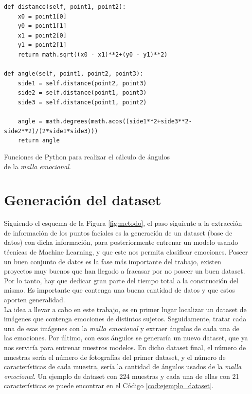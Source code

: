 \begin{code}[h]
\begin{lstlisting}[style=Python]
def distance(self, point1, point2):
    x0 = point1[0]
    y0 = point1[1]
    x1 = point2[0]
    y1 = point2[1]
    return math.sqrt((x0 - x1)**2+(y0 - y1)**2)

def angle(self, point1, point2, point3):
    side1 = self.distance(point2, point3)
    side2 = self.distance(point1, point3)
    side3 = self.distance(point1, point2)
    
    angle = math.degrees(math.acos((side1**2+side3**2-side2**2)/(2*side1*side3)))
    return angle
\end{lstlisting}
\captionsetup{justification=centering}
\caption[Funciones de Python para realizar el cálculo de ángulos\\
de la \textit{malla emocional}.]{Funciones de Python para realizar el cálculo de ángulos\\
de la \textit{malla emocional}.}
\label{cod:angulos}
\end{code}

\section{Generación del dataset}
\label{sec:generacion_dataset}

Siguiendo el esquema de la Figura \ref{fig:metodo}, el paso siguiente a la extracción de información de los puntos faciales es la generación de un dataset (base de datos) con dicha información, para posteriormente entrenar un modelo usando técnicas de Machine Learning, y que este nos permita clasificar emociones. Poseer un buen conjunto de datos es la fase más importante del trabajo, existen proyectos muy buenos que han llegado a fracasar por no poseer un buen dataset. Por lo tanto, hay que dedicar gran parte del tiempo total a la construcción del mismo. Es importante que contenga una buena cantidad de datos y que estos aporten generalidad.\\

La idea a llevar a cabo en este trabajo, es en primer lugar localizar un dataset de imágenes que contenga emociones de distintos sujetos. Seguidamente, tratar cada una de esas imágenes con la \textit{malla emocional} y extraer ángulos de cada una de las emociones. Por último, con esos ángulos se generaría un nuevo dataset, que ya nos serviría para entrenar nuestros modelos. En dicho dataset final, el número de muestras sería el número de fotografías del primer dataset, y el número de características de cada muestra, sería la cantidad de ángulos usados de la \textit{malla emocional}. Un ejemplo de dataset con 224 muestras y cada una de ellas con 21 características se puede encontrar en el Código \ref{cod:ejemplo_dataset}.\\

